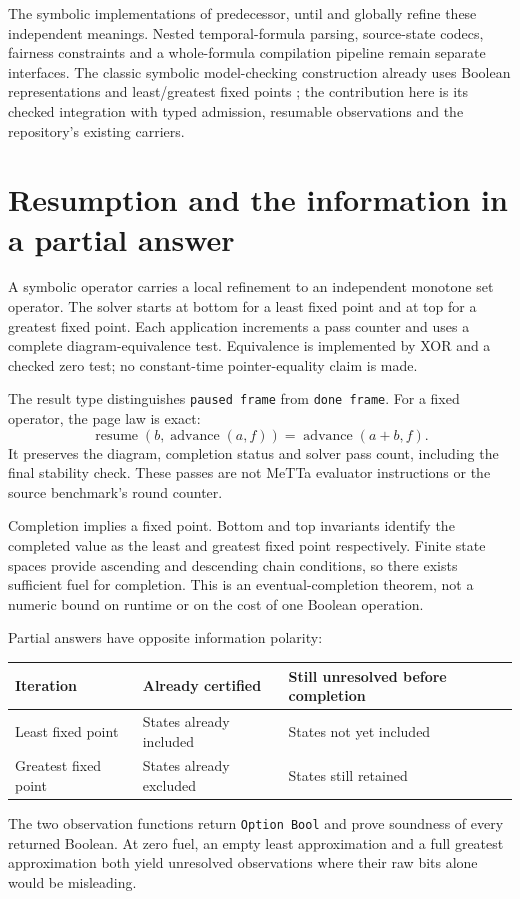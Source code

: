 \documentclass[11pt,a4paper]{article}
\newcommand{\code}[1]{\nolinkurl{#1}}
\begin{document}
The symbolic implementations of predecessor, until and globally refine these
independent meanings. Nested temporal-formula parsing, source-state codecs,
fairness constraints and a whole-formula compilation pipeline remain separate
interfaces. The classic symbolic model-checking construction already uses
Boolean representations and least/greatest fixed points \cite{burch}; the
contribution here is its checked integration with typed admission, resumable
observations and the repository's existing carriers.

\section{Resumption and the information in a partial answer}

A symbolic operator carries a local refinement to an independent monotone
set operator. The solver starts at bottom for a least fixed point and at top
for a greatest fixed point. Each application increments a pass counter and
uses a complete diagram-equivalence test. Equivalence is implemented by XOR
and a checked zero test; no constant-time pointer-equality claim is made.

The result type distinguishes \code{paused frame} from \code{done frame}.
For a fixed operator, the page law is exact:
\[
 \operatorname{resume}(b,\operatorname{advance}(a,f))
 =\operatorname{advance}(a+b,f).
\]
It preserves the diagram, completion status and solver pass count, including
the final stability check. These passes are not MeTTa evaluator instructions
or the source benchmark's round counter.

Completion implies a fixed point. Bottom and top invariants identify the
completed value as the least and greatest fixed point respectively. Finite
state spaces provide ascending and descending chain conditions, so there
exists sufficient fuel for completion. This is an eventual-completion theorem,
not a numeric bound on runtime or on the cost of one Boolean operation.

Partial answers have opposite information polarity:
\begin{center}
\begin{tabularx}{\linewidth}{@{}lXX@{}}
\toprule
Iteration & Already certified & Still unresolved before completion\\
\midrule
Least fixed point & States already included & States not yet included\\
Greatest fixed point & States already excluded & States still retained\\
\bottomrule
\end{tabularx}
\end{center}
The two observation functions return \code{Option Bool} and prove soundness
of every returned Boolean. At zero fuel, an empty least approximation and a
full greatest approximation both yield unresolved observations where their
raw bits alone would be misleading.
\end{document}
